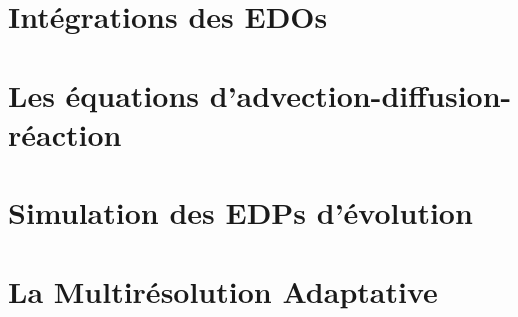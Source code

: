 \section{Intégrations des EDOs}\label{par:edo}

\section{Les équations d'advection-diffusion-réaction}
\label{par:adv-diff-reaction}

\section{Simulation des EDPs d'évolution}

\newpage
\section{La Multirésolution Adaptative}
\label{par:explication_MRA}

